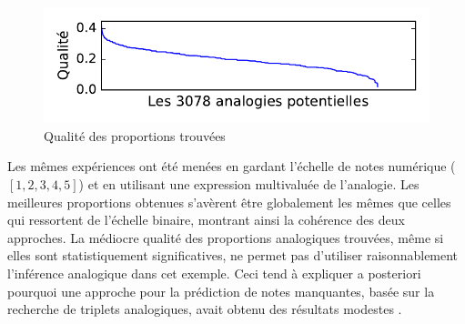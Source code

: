 \begin{figure}[h]
  \vspace{-0.4cm}
\caption{Qualité des proportions trouvées}
\label{qualite}
\includegraphics[scale=0.6]{figures/quality_of_proportions.pdf}
\vspace{-0.4cm}
\end{figure}
Les mêmes expériences ont été menées en gardant l'échelle de notes numérique
($[1, 2, 3, 4, 5]$) et en utilisant une expression multivaluée de l'analogie.
Les meilleures proportions obtenues s'avèrent être globalement les mêmes que
celles qui ressortent de l'échelle binaire, montrant ainsi la cohérence des
deux approches. La m\'ediocre qualit\'e des proportions analogiques trouv\'ees,
m\^eme si elles sont statistiquement significatives,
ne permet pas d'utiliser raisonnablement l'inf\'erence analogique dans cet exemple.
Ceci  tend \`a expliquer a posteriori pourquoi une approche pour la
pr\'ediction de notes manquantes, bas\'ee sur la recherche de triplets
analogiques, avait obtenu des r\'esultats modestes \cite{HugPraRicISMIS15}.
